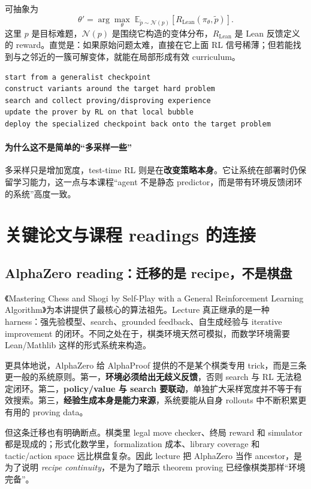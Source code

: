 可抽象为
\[
\theta' = \arg\max_{\theta}\;\mathbb{E}_{\tilde{p}\sim \mathcal{N}(p)}\left[R_{\mathrm{Lean}}\!\left(\pi_{\theta}, \tilde{p}\right)\right].
\]
这里 $p$ 是目标难题，$\mathcal{N}(p)$ 是围绕它构造的变体分布，$R_{\mathrm{Lean}}$ 是 Lean 反馈定义的 reward。直觉是：如果原始问题太难，直接在它上面 RL 信号稀薄；但若能找到与之邻近的一簇可解变体，就能在局部形成有效 curriculum。

\begin{lstlisting}
start from a generalist checkpoint
construct variants around the target hard problem
search and collect proving/disproving experience
update the prover by RL on that local bubble
deploy the specialized checkpoint back onto the target problem
\end{lstlisting}

\paragraph{为什么这不是简单的“多采样一些”}
多采样只是增加宽度，test-time RL 则是在\textbf{改变策略本身}。它让系统在部署时仍保留学习能力，这一点与本课程“agent 不是静态 predictor，而是带有环境反馈闭环的系统”高度一致。

\section{关键论文与课程 readings 的连接}

\subsection{AlphaZero reading：迁移的是 recipe，不是棋盘}

《Mastering Chess and Shogi by Self-Play with a General Reinforcement Learning Algorithm》为本讲提供了最核心的算法祖先。Lecture 真正继承的是一种 harness：强先验模型、search、grounded feedback、自生成经验与 iterative improvement 的闭环。不同之处在于，棋类环境天然可模拟，而数学环境需要 Lean/Mathlib 这样的形式系统来构造。

更具体地说，AlphaZero 给 AlphaProof 提供的不是某个棋类专用 trick，而是三条更一般的系统原则。第一，\textbf{环境必须给出无歧义反馈}，否则 search 与 RL 无法稳定闭环。第二，\textbf{policy/value 与 search 要联动}，单独扩大采样宽度并不等于有效搜索。第三，\textbf{经验生成本身是能力来源}，系统要能从自身 rollouts 中不断积累更有用的 proving data。

但这条迁移也有明确断点。棋类里 legal move checker、终局 reward 和 simulator 都是现成的；形式化数学里，formalization 成本、library coverage 和 tactic/action space 远比棋盘复杂。因此 lecture 把 AlphaZero 当作 ancestor，是为了说明 \emph{recipe continuity}，不是为了暗示 theorem proving 已经像棋类那样“环境完备”。

